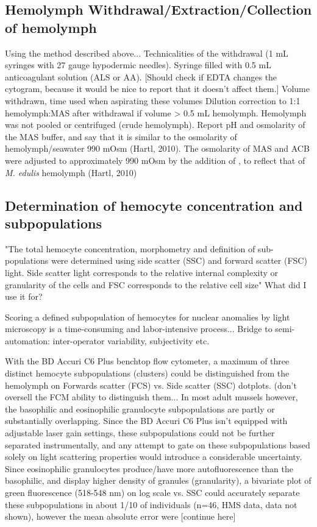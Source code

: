 \subsection{Hemolymph Withdrawal/Extraction/Collection of hemolymph}
Using the method described above...
Technicalities of the withdrawal (1 mL syringes with 27 gauge hypodermic needles).
Syringe filled with 0.5 mL anticoagulant solution (ALS or AA).
[Should check if EDTA changes the cytogram, because it would be nice to report that it doesn't affect them.] 
Volume withdrawn, time used when aspirating these volumes
Dilution correction to 1:1 hemolymph:MAS after withdrawal if volume > 0.5 mL hemolymph. 
Hemolymph was not pooled or centrifuged (crude hemolymph). Report pH and osmolarity of the MAS buffer, and say that it is similar to the osmolarity of hemolymph/seawater 990 mOsm (Hartl, 2010). The osmolarity of MAS and ACB were adjusted to approximately 990 mOsm by the addition of , to reflect that of \emph{M. edulis} hemolymph (Hartl, 2010)

\subsection{Determination of hemocyte concentration and subpopulations}
"The total hemocyte concentration, morphometry and definition of sub-populations were determined using side scatter (SSC) and forward scatter (FSC) light. Side scatter light corresponds to the relative internal complexity or granularity of the cells and FSC corresponds to the relative cell size" \cite{Rolton2020}
What did I use it for?

Scoring a defined subpopulation of hemocytes for nuclear anomalies by light microscopy is a time-consuming and labor-intensive process... Bridge to semi-automation: inter-operator variability, subjectivity etc.

With the BD Accuri C6 Plus benchtop flow cytometer, a maximum of three distinct hemocyte subpopulations (clusters) could be distinguished from the hemolymph on Forwards scatter (FCS) vs. Side scatter (SSC) dotplots. (don't oversell the FCM ability to distinguish them... In most adult mussels however, the basophilic and eosinophilic granulocyte subpopulations are partly or substantially overlapping. Since the BD Accuri C6 Plus isn't equipped with adjustable laser gain settings, these subpopulations could not be further separated instrumentally, and any attempt to gate on these subpopulations based solely on light scattering properties would introduce a considerable uncertainty. Since eosinophilic granulocytes produce/have more autofluorescence than the basophilic, and display higher density of granules (granularity), a bivariate plot of green fluorescence (518-548 nm) on log scale vs. SSC could accurately separate these subpopulations in about 1/10 of individuals (n=46, HMS data, data not shown), however the mean absolute error were [continue here]

